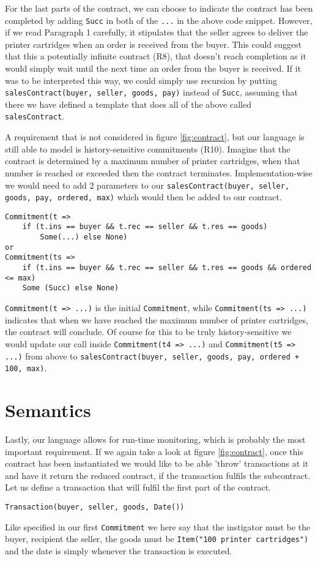 \documentclass{ituthesis}
\begin{document}
For the last parts of the contract, we can choose to indicate the contract has been completed by adding \texttt{Succ} in both of the \texttt{...} in the above code snippet. However, if we read Paragraph 1 carefully, it stipulates that the seller agrees to deliver the printer cartridges when an order is received from the buyer. This could suggest that this a potentially infinite contract (R8), that doesn't reach completion as it would simply wait until the next time an order from the buyer is received. If it was to be interpreted this way, we could simply use recursion by putting \texttt{salesContract(buyer, seller, goods, pay)} instead of \texttt{Succ}, assuming that there we have defined a template that does all of the above called \texttt{salesContract}.

A requirement that is not considered in figure \ref{fig:contract}, but our language is still able to model is history-sensitive commitments (R10). Imagine that the contract is determined by a maximum number of printer cartridges, when that number is reached or exceeded then the contract terminates. Implementation-wise we would need to add 2 parameters to our \texttt{salesContract(buyer, seller, goods, pay, ordered, max)} which would then be added to our contract.
\begin{lstlisting}
Commitment(t => 
    if (t.ins == buyer && t.rec == seller && t.res == goods) 
        Some(...) else None)
or
Commitment(ts => 
    if (t.ins == buyer && t.rec == seller && t.res == goods && ordered <= max)
    Some (Succ) else None)
\end{lstlisting}
\texttt{Commitment(t => ...)} is the initial \texttt{Commitment}, while \texttt{Commitment(ts => ...)} indicates that when we have reached the maximum number of printer cartridges, the contract will conclude. Of course for this to be truly history-sensitive we would update our call inside \texttt{Commitment(t4 => ...)} and \texttt{Commitment(t5 => ...)} from above to \texttt{salesContract(buyer, seller, goods, pay, ordered + 100, max)}.

\section{Semantics}

Lastly, our language allows for run-time monitoring, which is probably the most important requirement. If we again take a look at figure \ref{fig:contract}, once this contract has been instantiated we would like to be able 'throw' transactions at it and have it return the reduced contract, if the transaction fulfils the subcontract. Let us define a transaction that will fulfil the first part of the contract.
\begin{lstlisting}
Transaction(buyer, seller, goods, Date())
\end{lstlisting}{}
Like specified in our first \texttt{Commitment} we here say that the instigator must be the buyer, recipient the seller, the goods must be \texttt{Item("100 printer cartridges")} and the date is simply whenever the transaction is executed.
\end{document}
